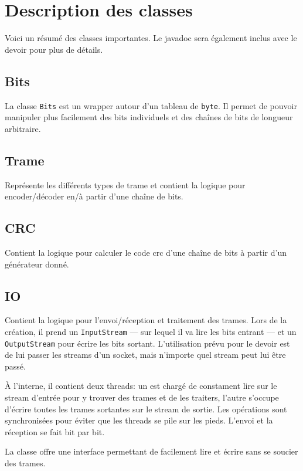 \documentclass{article}
\begin{document}
\clearpage

\section{Description des classes}
    Voici un résumé des classes importantes. Le javadoc sera également inclus avec le devoir pour plus de détails.
    
    \subsection{Bits}
    La classe \verb#Bits# est un wrapper autour d'un tableau de \verb#byte#. Il permet de pouvoir manipuler plus facilement des bits individuels et des chaînes de bits de longueur arbitraire.
    
    \subsection{Trame}
    Représente les différents types de trame et contient la logique pour encoder/décoder en/à partir d'une chaîne de bits.
    
    \subsection{CRC}
    Contient la logique pour calculer le code crc d'une chaîne de bits à partir d'un générateur donné.
    
    \subsection{IO}
    Contient la logique pour l'envoi/réception et traitement des trames.
    Lors de la création, il prend un \verb#InputStream# --- sur lequel il va lire les bits entrant --- et un \verb#OutputStream# pour écrire les bits sortant. L'utilisation prévu pour le devoir est de lui passer les streams d'un socket, mais n'importe quel stream peut lui être passé.

    À l'interne, il contient deux threads: un est chargé de constament lire sur le stream d'entrée pour y trouver des trames et de les traiters, l'autre s'occupe d'écrire toutes les trames sortantes sur le stream de sortie. Les opérations sont synchronisées pour éviter que les threads se pile sur les pieds. L'envoi et la réception se fait bit par bit.

    La classe offre une interface permettant de facilement lire et écrire sans se soucier des trames.
\end{document}
